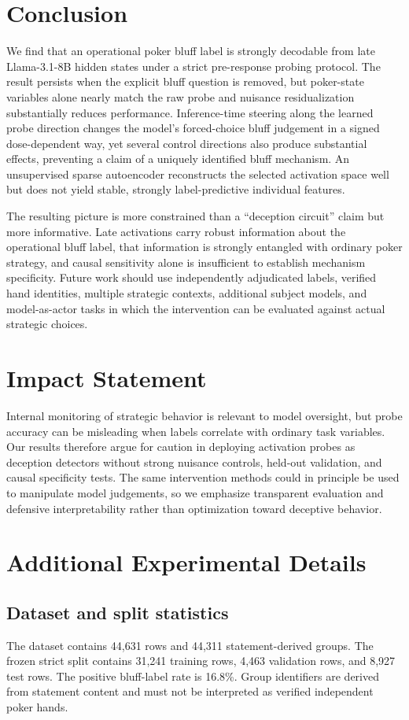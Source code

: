 \section{Conclusion}
We find that an operational poker bluff label is strongly decodable from late Llama-3.1-8B hidden states under a strict pre-response probing protocol. The result persists when the explicit bluff question is removed, but poker-state variables alone nearly match the raw probe and nuisance residualization substantially reduces performance. Inference-time steering along the learned probe direction changes the model's forced-choice bluff judgement in a signed dose-dependent way, yet several control directions also produce substantial effects, preventing a claim of a uniquely identified bluff mechanism. An unsupervised sparse autoencoder reconstructs the selected activation space well but does not yield stable, strongly label-predictive individual features.

The resulting picture is more constrained than a ``deception circuit'' claim but more informative. Late activations carry robust information about the operational bluff label, that information is strongly entangled with ordinary poker strategy, and causal sensitivity alone is insufficient to establish mechanism specificity. Future work should use independently adjudicated labels, verified hand identities, multiple strategic contexts, additional subject models, and model-as-actor tasks in which the intervention can be evaluated against actual strategic choices.

\section*{Impact Statement}
Internal monitoring of strategic behavior is relevant to model oversight, but probe accuracy can be misleading when labels correlate with ordinary task variables. Our results therefore argue for caution in deploying activation probes as deception detectors without strong nuisance controls, held-out validation, and causal specificity tests. The same intervention methods could in principle be used to manipulate model judgements, so we emphasize transparent evaluation and defensive interpretability rather than optimization toward deceptive behavior.

\appendix
\section{Additional Experimental Details}
\subsection{Dataset and split statistics}
The dataset contains 44,631 rows and 44,311 statement-derived groups. The frozen strict split contains 31,241 training rows, 4,463 validation rows, and 8,927 test rows. The positive bluff-label rate is 16.8\%. Group identifiers are derived from statement content and must not be interpreted as verified independent poker hands.

